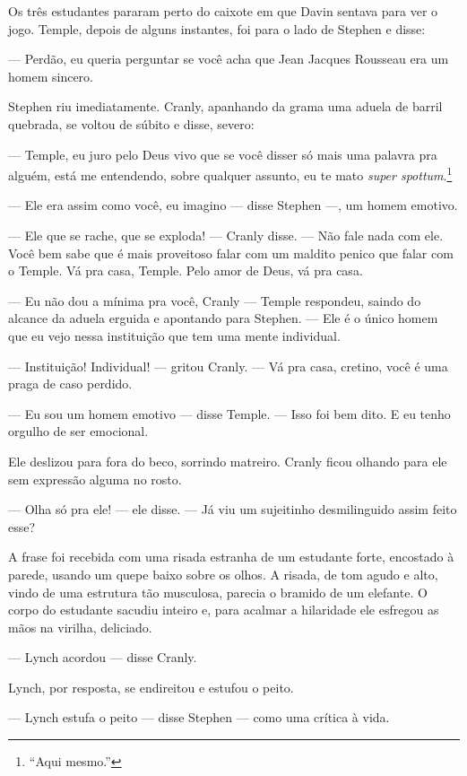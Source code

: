 Os três estudantes pararam perto do caixote em que Davin sentava para
ver o jogo. Temple, depois de alguns instantes, foi para o lado de
Stephen e disse:

 --- Perdão, eu queria perguntar se você acha que Jean Jacques Rousseau era
um homem sincero.

Stephen riu imediatamente. Cranly, apanhando da grama uma aduela de
barril quebrada, se voltou de súbito e disse, severo:

 --- Temple, eu juro pelo Deus vivo que se você disser só mais uma palavra
pra alguém, está me entendendo, sobre qualquer assunto, eu te mato
\textit{super spottum}.\footnote{ “Aqui mesmo.”}

 --- Ele era assim como você, eu imagino --- disse Stephen ---, um homem emotivo.

 --- Ele que se rache, que se exploda! --- Cranly disse. --- Não fale nada com ele.
Você bem sabe que é mais proveitoso falar com um maldito penico que
falar com o Temple. Vá pra casa, Temple. Pelo amor de Deus, vá pra
casa.

 --- Eu não dou a mínima pra você, Cranly --- Temple respondeu, saindo do
alcance da aduela erguida e apontando para Stephen. --- Ele é o único homem
que eu vejo nessa instituição que tem uma mente individual.

 --- Instituição! Individual! --- gritou Cranly. --- Vá pra casa, cretino, você é uma praga de caso perdido.

 --- Eu sou um homem emotivo --- disse Temple. --- Isso foi bem dito. E eu tenho
orgulho de ser emocional.

Ele deslizou para fora do beco, sorrindo matreiro. Cranly ficou olhando
para ele sem expressão alguma no rosto.

 --- Olha só pra ele! --- ele disse. --- Já viu um sujeitinho desmilinguido assim feito
esse?

A frase foi recebida com uma risada estranha de um estudante forte,
encostado à parede, usando um quepe baixo sobre os olhos. A risada, de
tom agudo e alto, vindo de uma estrutura tão musculosa, parecia o
bramido de um elefante. O corpo do estudante sacudiu inteiro e, para
acalmar a hilaridade ele esfregou as mãos na virilha, deliciado.

 --- Lynch acordou --- disse Cranly.

Lynch, por resposta, se endireitou e estufou o peito.

 --- Lynch estufa o peito --- disse Stephen --- como uma crítica à vida.

